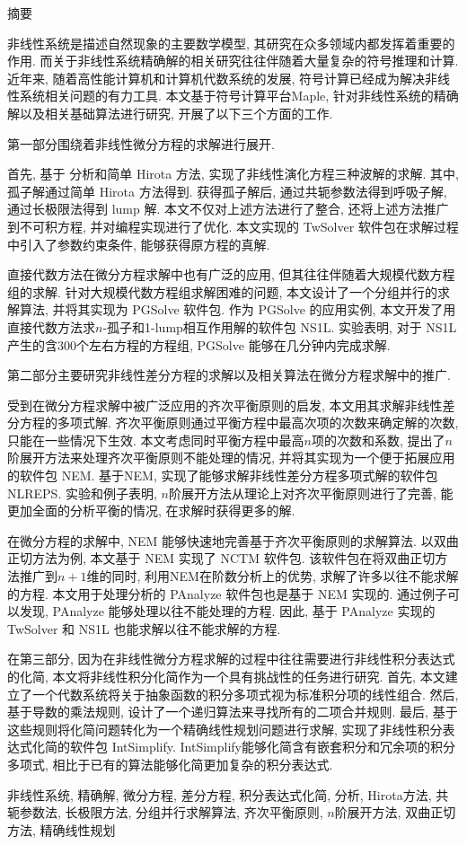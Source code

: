 {}
\centerline{\heiti 摘\quad 要}

\linespread{1.4} \bigskip

非线性系统是描述自然现象的主要数学模型, 其研究在众多领域内都发挥着重要的作用. 而关于非线性系统精确解的相关研究往往伴随着大量复杂的符号推理和计算. 近年来, 随着高性能计算机和计算机代数系统的发展, 符号计算已经成为解决非线性系统相关问题的有力工具. 本文基于符号计算平台Maple, 针对非线性系统的精确解以及相关基础算法进行研究, 开展了以下三个方面的工作. 

第一部分围绕着非线性微分方程的求解进行展开. 

首先, 基于 \Painleve{} 分析和简单 Hirota 方法, 实现了非线性演化方程三种波解的求解. 其中, 孤子解通过简单 Hirota 方法得到. 获得孤子解后, 通过共轭参数法得到呼吸子解, 通过长极限法得到 lump 解. 本文不仅对上述方法进行了整合, 还将上述方法推广到不可积方程, 并对编程实现进行了优化. 本文实现的 TwSolver 软件包在求解过程中引入了参数约束条件, 能够获得原方程的真解.  

直接代数方法在微分方程求解中也有广泛的应用, 但其往往伴随着大规模代数方程组的求解. 针对大规模代数方程组求解困难的问题, 本文设计了一个分组并行的求解算法, 并将其实现为 PGSolve 软件包. 作为 PGSolve 的应用实例, 本文开发了用直接代数方法求$n$-孤子和1-lump相互作用解的软件包 NS1L. 实验表明, 对于 NS1L 产生的含300个左右方程的方程组, PGSolve 能够在几分钟内完成求解. 

第二部分主要研究非线性差分方程的求解以及相关算法在微分方程求解中的推广. 

受到在微分方程求解中被广泛应用的齐次平衡原则的启发, 本文用其求解非线性差分方程的多项式解. 齐次平衡原则通过平衡方程中最高次项的次数来确定解的次数, 只能在一些情况下生效. 本文考虑同时平衡方程中最高$n$项的次数和系数, 提出了$n$阶展开方法来处理齐次平衡原则不能处理的情况, 并将其实现为一个便于拓展应用的软件包 NEM. 基于NEM, 实现了能够求解非线性差分方程多项式解的软件包 NLREPS. 实验和例子表明, $n$阶展开方法从理论上对齐次平衡原则进行了完善, 能更加全面的分析平衡的情况, 在求解时获得更多的解. 

在微分方程的求解中, NEM 能够快速地完善基于齐次平衡原则的求解算法. 以双曲正切方法为例, 本文基于 NEM 实现了 NCTM 软件包. 该软件包在将双曲正切方法推广到$n+1$维的同时, 利用NEM在阶数分析上的优势, 求解了许多以往不能求解的方程. 本文用于处理\Painleve{}分析的 PAnalyze 软件包也是基于 NEM 实现的. 通过例子可以发现, PAnalyze 能够处理以往不能处理的方程. 因此, 基于 PAnalyze 实现的 TwSolver 和 NS1L 也能求解以往不能求解的方程. 

在第三部分, 因为在非线性微分方程求解的过程中往往需要进行非线性积分表达式的化简, 本文将非线性积分化简作为一个具有挑战性的任务进行研究. 首先, 本文建立了一个代数系统将关于抽象函数的积分多项式视为标准积分项的线性组合. 然后, 基于导数的乘法规则, 设计了一个递归算法来寻找所有的二项合并规则. 最后, 基于这些规则将化简问题转化为一个精确线性规划问题进行求解, 实现了非线性积分表达式化简的软件包 IntSimplify.  IntSimplify能够化简含有嵌套积分和冗余项的积分多项式, 相比于已有的算法能够化简更加复杂的积分表达式. 

\bigskip

非线性系统, 精确解, 微分方程, 差分方程, 积分表达式化简, \Painleve{}分析, Hirota方法, 共轭参数法, 长极限方法, 分组并行求解算法, 齐次平衡原则, $n$阶展开方法, 双曲正切方法, 精确线性规划



